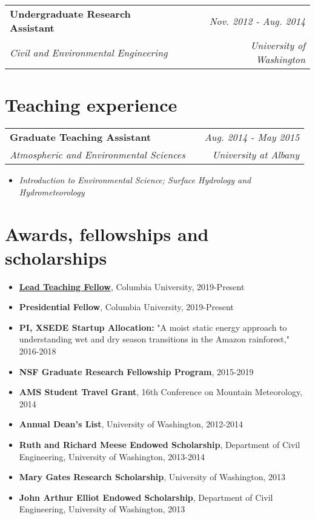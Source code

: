 \documentclass[letterpaper]{article}
\begin{document}
\begin{center}
  \begin{tabularx}{\textwidth}{lXr}
    \textbf{Undergraduate Research Assistant} &  & \emph{Nov. 2012 - Aug. 2014}\\
    \emph{Civil and Environmental Engineering} &  & \emph{University of Washington}\\
  \end{tabularx}
\end{center}

\section{Teaching experience}
\label{sec:org8ff7472}

\begin{center}
  \begin{tabularx}{\textwidth}{lXr}
    \textbf{Graduate Teaching Assistant} &  & \emph{Aug. 2014 - May 2015}\\
    \emph{Atmospheric and Environmental Sciences} &  & \emph{University at Albany}\\
  \end{tabularx}
\end{center}
\begin{itemize}
\item \emph{Introduction to Environmental Science; Surface Hydrology and Hydrometeorology}
\end{itemize}

\section{Awards, fellowships and scholarships}
\label{sec:org83586fe}

\begin{itemize}
\item \textbf{\href{https://ctl.columbia.edu/graduate-instructors/opportunities-for-graduate-students/lead-teaching-fellows/}{Lead Teaching Fellow}}, Columbia University, 2019-Present
\item \textbf{Presidential Fellow}, Columbia University, 2019-Present
\item \textbf{PI, XSEDE Startup Allocation:} "A moist static energy approach to
  understanding wet and dry season transitions in the Amazon
  rainforest," 2016-2018
\item \textbf{NSF Graduate Research Fellowship Program}, 2015-2019
\item \textbf{AMS Student Travel Grant}, 16th Conference on Mountain Meteorology, 2014
\item \textbf{Annual Dean's List}, University of Washington, 2012-2014
\item \textbf{Ruth and Richard Meese Endowed Scholarship}, Department of Civil Engineering, University of Washington, 2013-2014
\item \textbf{Mary Gates Research Scholarship},  University of Washington, 2013
\item \textbf{John Arthur Elliot Endowed Scholarship}, Department of Civil
  Engineering,  University of Washington, 2013
\end{itemize}
\end{document}
